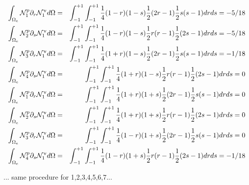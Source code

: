 \begin{tiny}

\begin{eqnarray}
\int_{\Omega_e}  {\mathcal{N}}_1^p \partial_r {\mathcal{N}}_1^\upnu d\Omega &=&  
\int_{-1}^{+1}\int_{-1}^{+1}\frac{1}{4}(1-r)(1-s) \frac{1}{2}(2r-1) \frac{1}{2}s(s-1) dr ds = -5/18 \nonumber\\
\int_{\Omega_e}  {\mathcal{N}}_2^p \partial_s {\mathcal{N}}_1^\upnu d\Omega &=&  
\int_{-1}^{+1}\int_{-1}^{+1}\frac{1}{4}(1-r)(1-s) \frac{1}{2}r(r-1) \frac{1}{2}(2s-1) dr ds = -5/18 \nonumber\\
\int_{\Omega_e}  {\mathcal{N}}_3^p \partial_r {\mathcal{N}}_1^\upnu d\Omega &=&  
\int_{-1}^{+1}\int_{-1}^{+1}\frac{1}{4}(1+r)(1-s) \frac{1}{2}(2r-1) \frac{1}{2}s(s-1) dr ds = -1/18 \nonumber\\
\int_{\Omega_e}  {\mathcal{N}}_4^p \partial_s {\mathcal{N}}_1^\upnu d\Omega &=&  
\int_{-1}^{+1}\int_{-1}^{+1}\frac{1}{4}(1+r)(1-s) \frac{1}{2}r(r-1) \frac{1}{2}(2s-1) dr ds = 0 \nonumber\\
\int_{\Omega_e}  {\mathcal{N}}_1^p \partial_r {\mathcal{N}}_1^\upnu d\Omega &=&  
\int_{-1}^{+1}\int_{-1}^{+1}\frac{1}{4}(1+r)(1+s) \frac{1}{2}(2r-1) \frac{1}{2}s(s-1) dr ds = 0 \nonumber\\
\int_{\Omega_e}  {\mathcal{N}}_2^p \partial_s {\mathcal{N}}_1^\upnu d\Omega &=&  
\int_{-1}^{+1}\int_{-1}^{+1}\frac{1}{4}(1+r)(1+s) \frac{1}{2}r(r-1) \frac{1}{2}(2s-1) dr ds = 0 \nonumber\\
\int_{\Omega_e}  {\mathcal{N}}_3^p \partial_r {\mathcal{N}}_1^\upnu d\Omega &=&  
\int_{-1}^{+1}\int_{-1}^{+1}\frac{1}{4}(1-r)(1+s) \frac{1}{2}(2r-1) \frac{1}{2}s(s-1) dr ds = 0 \nonumber\\
\int_{\Omega_e}  {\mathcal{N}}_4^p \partial_s {\mathcal{N}}_1^\upnu d\Omega &=&  
\int_{-1}^{+1}\int_{-1}^{+1}\frac{1}{4}(1-r)(1+s) \frac{1}{2}r(r-1) \frac{1}{2}(2s-1) dr ds = -1/18 \nonumber
\end{eqnarray}

... same procedure for 1,2,3,4,5,6,7...


\end{tiny}
